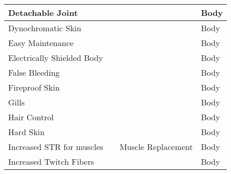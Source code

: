 \documentclass[twoside]{book}
\begin{document}
\begin{longtable}{p{1.25in}p{2em}ll}
  \raggedright
           Detachable Joint 
  &
  
  &
  
  &
   Body 
  \tabularnewline
  \hline
      
  \raggedright
           Dynochromatic Skin 
  &
  
  &
  
  &
   Body 
  \tabularnewline
  \hline
      
  \raggedright
           Easy Maintenance 
  &
  
  &
  
  &
   Body 
  \tabularnewline
  \hline
      
  \raggedright
           Electrically Shielded Body
           
  &
  
  &
  
  &
   Body 
  \tabularnewline
  \hline
      
  \raggedright
           False Bleeding 
  &
  
  &
  
  &
   Body 
  \tabularnewline
  \hline
      
  \raggedright
           Fireproof Skin 
  &
  
  &
  
  &
   Body 
  \tabularnewline
  \hline
      
  \raggedright
           Gills 
  &
  
  &
  
  &
   Body 
  \tabularnewline
  \hline
      
  \raggedright
           Hair Control 
  &
  
  &
  
  &
   Body 
  \tabularnewline
  \hline
      
  \raggedright
           Hard Skin 
  &
  
  &
  
  &
   Body 
  \tabularnewline
  \hline
      
  \raggedright
           Increased STR for muscles
           
  &
  
  &
   Muscle Replacement
           
  &
   Body 
  \tabularnewline
  \hline
      
  \raggedright
           Increased Twitch Fibers
           
  &
  
  &
  
  &
   Body 
  \tabularnewline
  \hline
      

\end{longtable}
\end{document}
